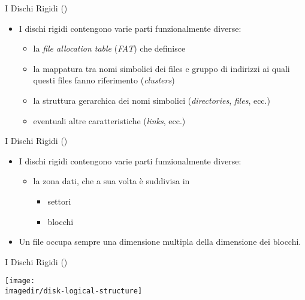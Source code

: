 \setcounter{ms}{1}
\begin{slide}{{I Dischi Rigidi ()}}
{

	\begin{itemize}

		\item I dischi rigidi contengono varie parti funzionalmente diverse:

			\vspace{6mm}
			\begin{itemize}
			\setlength{\itemsep}{4mm}

				\item la \emph{file allocation table} (\emph{FAT})
                      che definisce

				\item la mappatura tra nomi simbolici dei files
				      e gruppo di indirizzi ai quali questi files
					  fanno riferimento (\emph{clusters})

				\item la struttura gerarchica dei nomi simbolici
                      (\emph{directories}, \emph{files}, ecc.)

				\item eventuali altre caratteristiche
                      (\emph{links}, ecc.)

			\end{itemize}

	\end{itemize}
}
\end{slide}

\begin{slide}{{I Dischi Rigidi ()}}
{

	\begin{itemize}
	\setlength{\itemsep}{8mm}

		\item I dischi rigidi contengono varie parti funzionalmente diverse:

			\vspace{6mm}
			\begin{itemize}

				\item la zona dati, che a sua volta \`e suddivisa in

					\begin{itemize}

						\item settori

						\item blocchi

					\end{itemize}

			\end{itemize}

		\item Un file occupa sempre una dimensione multipla
		      della dimensione dei blocchi.

	\end{itemize}
}
\end{slide}

\begin{slide}{{I Dischi Rigidi ()}}
{

	\begin{center}
		\texttt{[image: \\imagedir/disk-logical-structure]}
	\end{center}
	
}
\end{slide}

